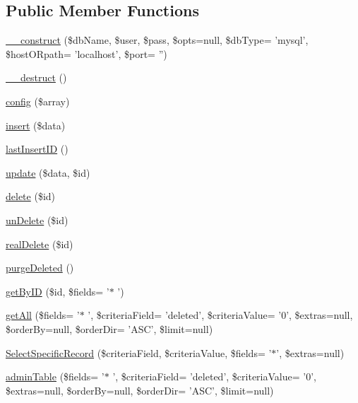 \subsection*{Public Member Functions}
\begin{DoxyCompactItemize}
\item 
\hyperlink{class_c_r_u_dadmin_p_d_o_a7f93adf2a111686240ea50fdd8bd8ebf}{\-\_\-\-\_\-construct} (\$db\-Name, \$user, \$pass, \$opts=null, \$db\-Type= 'mysql', \$host\-O\-Rpath= 'localhost', \$port= '')
\item 
\hyperlink{class_c_r_u_dadmin_p_d_o_a421831a265621325e1fdd19aace0c758}{\-\_\-\-\_\-destruct} ()
\item 
\hyperlink{class_c_r_u_dadmin_p_d_o_a057f051ca656f78a79ca981dacebc88e}{config} (\$array)
\item 
\hyperlink{class_c_r_u_dadmin_p_d_o_a2e355627d2f4a96559f022c4ab82df3c}{insert} (\$data)
\item 
\hyperlink{class_c_r_u_dadmin_p_d_o_a342821d7c67c9611bc7be824c5df8464}{last\-Insert\-I\-D} ()
\item 
\hyperlink{class_c_r_u_dadmin_p_d_o_a1d8c1067487068c15fdf6bf9a1c9cad5}{update} (\$data, \$id)
\item 
\hyperlink{class_c_r_u_dadmin_p_d_o_a2f8258add505482d7f00ea26493a5723}{delete} (\$id)
\item 
\hyperlink{class_c_r_u_dadmin_p_d_o_a6c93c8a03666211ecc629f533d87fede}{un\-Delete} (\$id)
\item 
\hyperlink{class_c_r_u_dadmin_p_d_o_a62e2e537ded1658daab4890c47e65cac}{real\-Delete} (\$id)
\item 
\hyperlink{class_c_r_u_dadmin_p_d_o_a3f2ceed45deff29e9ddceecacc401b21}{purge\-Deleted} ()
\item 
\hyperlink{class_c_r_u_dadmin_p_d_o_a53634d1376ca031c9fb15fc6c414b38d}{get\-By\-I\-D} (\$id, \$fields= '$\ast$ ')
\item 
\hyperlink{class_c_r_u_dadmin_p_d_o_aac8a1278b0a669d6aef1d88833acc356}{get\-All} (\$fields= '$\ast$ ', \$criteria\-Field= 'deleted', \$criteria\-Value= '0', \$extras=null, \$order\-By=null, \$order\-Dir= 'A\-S\-C', \$limit=null)
\item 
\hyperlink{class_c_r_u_dadmin_p_d_o_ac591b2f363dc25c0c4fb3908a66fc510}{Select\-Specific\-Record} (\$criteria\-Field, \$criteria\-Value, \$fields= '$\ast$', \$extras=null)
\item 
\hyperlink{class_c_r_u_dadmin_p_d_o_ad7987609659b16267a44981bd5e64b3a}{admin\-Table} (\$fields= '$\ast$ ', \$criteria\-Field= 'deleted', \$criteria\-Value= '0', \$extras=null, \$order\-By=null, \$order\-Dir= 'A\-S\-C', \$limit=null)
\end{DoxyCompactItemize}
